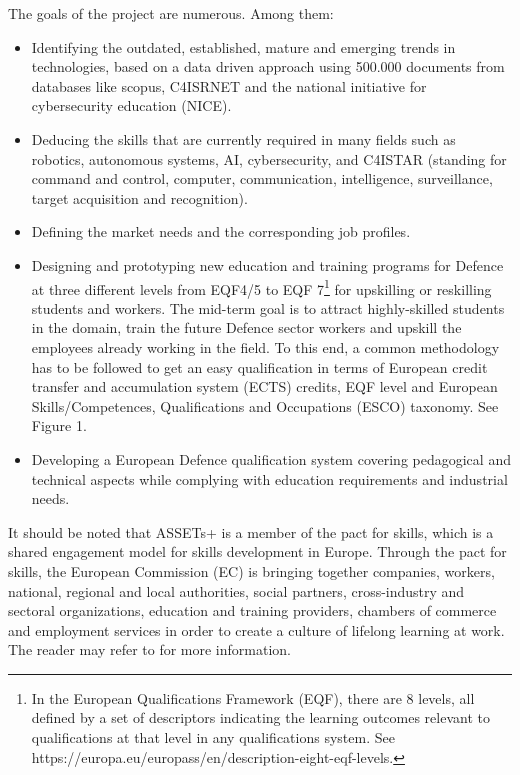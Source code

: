 \documentclass[conference]{IEEEtran}
\begin{document}
\noindent The goals of the project are numerous. Among them:
\begin{itemize}
    \item Identifying the outdated, established, mature and emerging trends in technologies, based on a data driven approach using 500.000 documents from databases like scopus, C4ISRNET and the national initiative for cybersecurity education (NICE).
    \item Deducing the skills that are currently required in many fields such as robotics, autonomous systems, AI, cybersecurity, and C4ISTAR (standing for command and control, computer, communication, intelligence, surveillance, target acquisition and recognition).
    \item Defining the market needs and the corresponding job profiles.
    \item Designing and prototyping new education and training programs for Defence at three different levels from EQF4/5 to EQF 7\footnote{In the European Qualifications Framework (EQF), there are 8 levels, all defined by a set of descriptors indicating the learning outcomes relevant to qualifications at that level in any qualifications system. See https://europa.eu/europass/en/description-eight-eqf-levels.} for upskilling or reskilling students and workers. The mid-term goal is to attract highly-skilled students in the domain, train the future Defence sector workers and upskill the employees already working in the field.  To this end, a common methodology has to be followed to get an easy qualification in terms of European credit transfer and accumulation system (ECTS) credits, EQF level and European Skills/Competences, Qualifications and Occupations (ESCO) taxonomy. See Figure 1.
    \item Developing a European Defence qualification system covering pedagogical and technical aspects while complying with education requirements and industrial needs.
\end{itemize}

\noindent It should be noted that ASSETs+ is a member of the pact for skills, which is a shared engagement model for skills development in Europe. Through the pact for skills, the European Commission (EC) is bringing together companies, workers, national, regional and local authorities, social partners, cross-industry and sectoral organizations, education and training providers, chambers of commerce and employment services in order to create a culture of lifelong learning at work. The reader may refer to  for more information.
\end{document}
